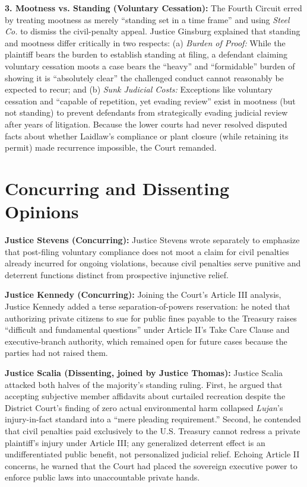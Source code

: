 \documentclass[12pt]{article}
\begin{document}
\textbf{3. Mootness vs. Standing (Voluntary Cessation):} The Fourth Circuit erred by treating mootness as merely ``standing set in a time frame'' and using \textit{Steel Co.} to dismiss the civil-penalty appeal. Justice Ginsburg explained that standing and mootness differ critically in two respects: (a) \textit{Burden of Proof:} While the plaintiff bears the burden to establish standing at filing, a defendant claiming voluntary cessation moots a case bears the ``heavy'' and ``formidable'' burden of showing it is ``absolutely clear'' the challenged conduct cannot reasonably be expected to recur; and (b) \textit{Sunk Judicial Costs:} Exceptions like voluntary cessation and ``capable of repetition, yet evading review'' exist in mootness (but not standing) to prevent defendants from strategically evading judicial review after years of litigation. Because the lower courts had never resolved disputed facts about whether Laidlaw's compliance or plant closure (while retaining its permit) made recurrence impossible, the Court remanded.

\section{Concurring and Dissenting Opinions}
\textbf{Justice Stevens (Concurring):} Justice Stevens wrote separately to emphasize that post-filing voluntary compliance does not moot a claim for civil penalties already incurred for ongoing violations, because civil penalties serve punitive and deterrent functions distinct from prospective injunctive relief.

\textbf{Justice Kennedy (Concurring):} Joining the Court's Article III analysis, Justice Kennedy added a terse separation-of-powers reservation: he noted that authorizing private citizens to sue for public fines payable to the Treasury raises ``difficult and fundamental questions'' under Article II's Take Care Clause and executive-branch authority, which remained open for future cases because the parties had not raised them.

\textbf{Justice Scalia (Dissenting, joined by Justice Thomas):} Justice Scalia attacked both halves of the majority's standing ruling. First, he argued that accepting subjective member affidavits about curtailed recreation despite the District Court's finding of zero actual environmental harm collapsed \textit{Lujan}'s injury-in-fact standard into a ``mere pleading requirement.'' Second, he contended that civil penalties paid exclusively to the U.S. Treasury cannot redress a private plaintiff's injury under Article III; any generalized deterrent effect is an undifferentiated public benefit, not personalized judicial relief. Echoing Article II concerns, he warned that the Court had placed the sovereign executive power to enforce public laws into unaccountable private hands.
\end{document}
